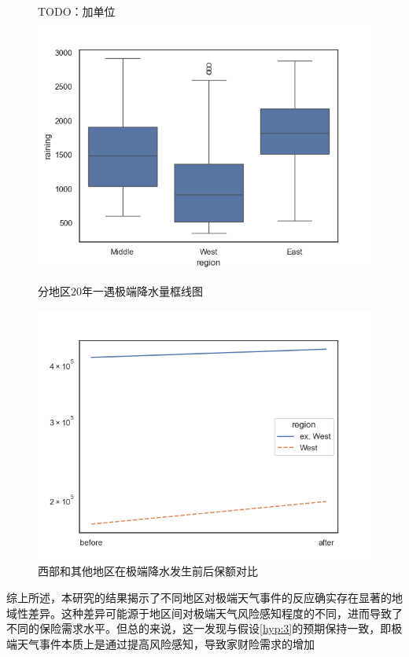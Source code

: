 \begin{figure}[H]
    \centering
    \begin{minipage}{0.48\linewidth}
        TODO：加单位
        \includegraphics[width=\linewidth]{lib/img/rainings.png}
        \caption{分地区20年一遇极端降水量框线图}\label{fig:rainings}
    \end{minipage}
    \begin{minipage}{0.48\linewidth}
        \includegraphics[width=\linewidth]{lib/img/covbyregion.png}
        \caption{西部和其他地区在极端降水发生前后保额对比}
    \end{minipage}
\end{figure}

综上所述，本研究的结果揭示了不同地区对极端天气事件的反应确实存在显著的地域性差异。这种差异可能源于地区间对极端天气风险感知程度的不同，进而导致了不同的保险需求水平。但总的来说，这一发现与假设\ref{hyp:3}的预期保持一致，即极端天气事件本质上是通过提高风险感知，导致家财险需求的增加

